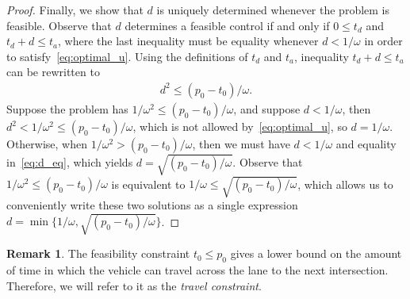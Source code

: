 \documentclass[a4paper]{article}
\theoremstyle{definition}
\newtheorem{remark}{Remark}
\theoremstyle{plain}
\begin{document}
\begin{proof}
Finally, we show that $d$ is uniquely determined whenever the problem is feasible.
%
Observe that $d$ determines a feasible control if and only if $0 \leq t_{d}$ and
$t_{d} + d \leq t_{a}$, where the last inequality must be equality whenever
$d < 1 / \omega$ in order to satisfy~\eqref{eq:optimal_u}.
%
Using the definitions of $t_{d}$ and $t_{a}$, inequality $t_{d} + d \leq t_{a}$
can be rewritten to
\begin{align}
  \label{eq:d_eq}
  d^{2} \leq (p_{0} - t_{0}) / \omega .
\end{align}
Suppose the problem has $1/ \omega^{2} \leq (p_{0} - t_{0}) / \omega$, and suppose
$d < 1/ \omega$, then $d^{2} < 1/\omega^{2} \leq (p_{0} - t_{0}) / \omega$, which is
not allowed by~\eqref{eq:optimal_u}, so $d = 1/ \omega$.
%
Otherwise, when $1 / \omega^{2} > (p_{0} - t_{0}) / \omega$, then we must have $d < 1/\omega$ and equality in~\eqref{eq:d_eq}, which yields $d = \sqrt{(p_{0} - t_{0}) / \omega}$.
%
Observe that
$1/\omega^{2} \leq (p_{0} - t_{0}) / \omega$ is equivalent to $1/ \omega \leq \sqrt{(p_{0} - t_{0}) / \omega}$,
which allows us to conveniently write these two solutions as a single expression
$d = \min\{1/ \omega, \sqrt{(p_{0} - t_{0}) / \omega}\}$.
\end{proof}

\begin{remark}
  The feasibility constraint $t_{0} \leq p_{0}$ gives a lower bound on the amount
  of time in which the vehicle can travel across the lane to the next
  intersection. Therefore, we will refer to it as the \emph{travel constraint}.
\end{remark}
\end{document}

